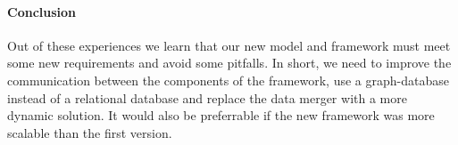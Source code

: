 \paragraph{Conclusion} Out of these experiences we learn that our new model and framework must meet some new requirements and avoid some pitfalls. In short, we need to improve the communication between the components of the framework, use a graph-database instead of a relational database and replace the data merger with a more dynamic solution. It would also be preferrable if the new framework was more scalable than the first version.